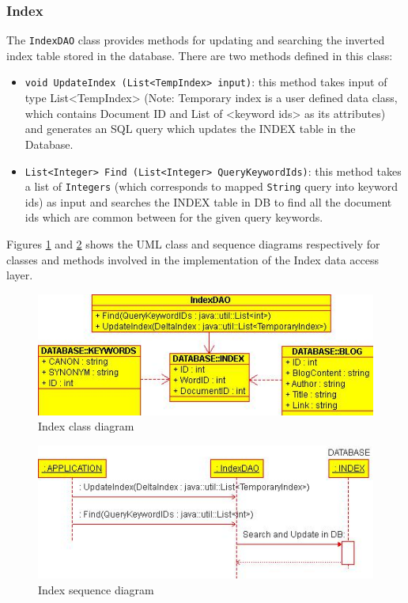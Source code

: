 \documentclass[10pt]{report}
\begin{document}
\subsubsection{Index}
The \texttt{IndexDAO} class provides methods for updating and
searching the inverted index table stored in the database. There are
two methods defined in this class: 

\begin{itemize}
\item \texttt{void UpdateIndex (List<TempIndex> input)}: this method
  takes input of type List<TempIndex> (Note: Temporary index is a user
  defined data class, which contains Document ID and List of <keyword
  ids> as its attributes) and generates an SQL query which updates the
  INDEX table in the Database. 

\item \texttt{List<Integer> Find (List<Integer> QueryKeywordIds)}:
  this method takes a list of \texttt{Integers} (which corresponds to
  mapped \texttt{String} query into keyword ids) as input and searches
  the INDEX table in DB to find all the document ids which are common
  between for the given query keywords. 
\end{itemize}

 Figures \ref{fig:indexclassdiagram} and
 \ref{fig:indexsequencediagram} shows the UML class and sequence
 diagrams respectively for classes and methods involved in the
 implementation of the Index data access layer.

\begin{figure}
  \begin{center}
        \includegraphics[width=\textwidth,height=!]{indexclassdiagram}
  \end{center}
  \caption{Index class diagram}
  \label{fig:indexclassdiagram}
\end{figure} 

\begin{figure}
  \begin{center}
        \includegraphics[width=\textwidth,height=!]{indexsequencediagram}
  \end{center}
  \caption{Index sequence diagram}
  \label{fig:indexsequencediagram}
\end{figure} 
\end{document}
